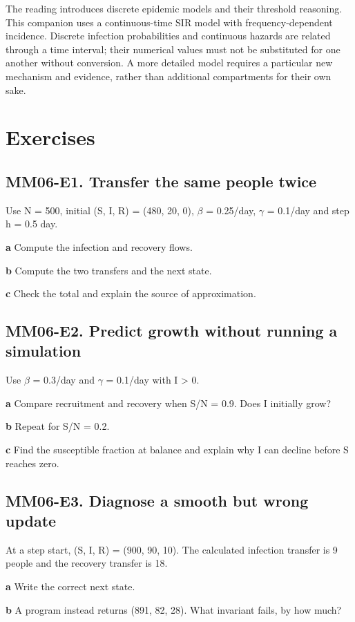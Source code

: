 \documentclass[11pt,letterpaper]{article}
\theoremstyle{definition}\newtheorem{definition}{Definition}\newtheorem{example}{Example}
\numberwithin{equation}{section}
\begin{document}
The reading introduces discrete epidemic models and their threshold reasoning. This companion uses a continuous-time SIR model with frequency-dependent incidence. Discrete infection probabilities and continuous hazards are related through a time interval; their numerical values must not be substituted for one another without conversion. A more detailed model requires a particular new mechanism and evidence, rather than additional compartments for their own sake.
\bigskip
\section*{Exercises}
\par\noindent\begin{minipage}{\linewidth}
\subsection*{MM06-E1. Transfer the same people twice}
Use N =\allowbreak{} 500, initial (S, I, R) =\allowbreak{} (480, 20, 0), $\beta$ =\allowbreak{} 0.25/day, $\gamma$ =\allowbreak{} 0.1/day and step h =\allowbreak{} 0.5 day.

\textbf{a} Compute the infection and recovery flows.

\end{minipage}\par\medskip
\textbf{b} Compute the two transfers and the next state.

\textbf{c} Check the total and explain the source of approximation.

\par\noindent\begin{minipage}{\linewidth}
\subsection*{MM06-E2. Predict growth without running a simulation}
Use $\beta$ =\allowbreak{} 0.3/day and $\gamma$ =\allowbreak{} 0.1/day with I > 0.

\textbf{a} Compare recruitment and recovery when S/N =\allowbreak{} 0.9. Does I initially grow?

\end{minipage}\par\medskip
\textbf{b} Repeat for S/N =\allowbreak{} 0.2.

\textbf{c} Find the susceptible fraction at balance and explain why I can decline before S reaches zero.

\par\noindent\begin{minipage}{\linewidth}
\subsection*{MM06-E3. Diagnose a smooth but wrong update}
At a step start, (S, I, R) =\allowbreak{} (900, 90, 10). The calculated infection transfer is 9 people and the recovery transfer is 18.

\textbf{a} Write the correct next state.

\end{minipage}\par\medskip
\textbf{b} A program instead returns (891, 82, 28). What invariant fails, by how much?
\end{document}
